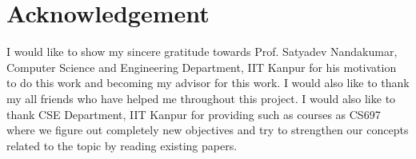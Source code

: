 \documentclass{article}
\begin{document}
\section{Acknowledgement}
I would like to show my sincere gratitude towards Prof. Satyadev Nandakumar, Computer Science and Engineering Department, IIT Kanpur for his motivation to do this work and becoming my advisor for this work. I would also like to thank my all friends who have helped me throughout this project. I would also like to thank CSE Department, IIT Kanpur for providing such as courses as CS697 where we figure out completely new objectives and try to strengthen our concepts related to the topic by reading existing papers.

\nocite{*}
{}

\end{document}
